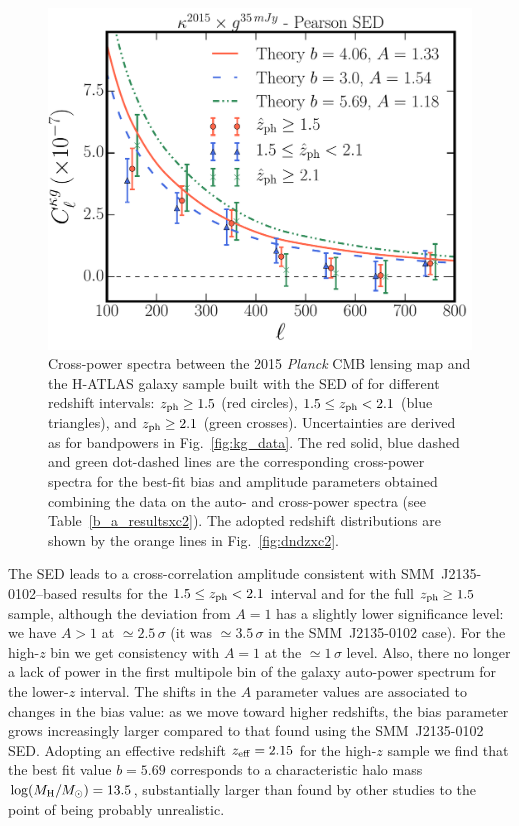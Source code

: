 \begin{figure} %
\centering %
\includegraphics[width=\textwidth]{Chapter4/Images/kg_ALL_2015_z15_21_10_Pearson_35mJy_3sigma}
\caption{Cross-power spectra between the 2015 \emph{Planck} CMB lensing map and the H-ATLAS galaxy sample built with the SED of \cite{Pearson2013} for different redshift intervals: $z_{\rm{ph}} \ge 1.5$ (red circles), $1.5 \le z_{\rm{ph}} < 2.1$ (blue triangles), and $z_{\rm{ph}}\ge 2.1$ (green crosses). Uncertainties are derived as for bandpowers in Fig.~\eqref{fig:kg_data}. The red solid, blue dashed and green dot-dashed lines are the corresponding cross-power spectra for the best-fit bias and amplitude parameters obtained combining the data on the auto- and cross-power spectra (see Table~\eqref{b_a_resultsxc2}). The adopted redshift distributions are shown by the orange lines in Fig.~\eqref{fig:dndzxc2}.
\label{fig:kg_data_tomo_Pearson}}
\end{figure}

The \citet{Pearson2013} SED leads to a cross-correlation amplitude consistent with SMM~J2135-0102--based results for the $1.5 \le z_{\rm{ph}} < 2.1$ interval and for the full $z_{\rm{ph}}\ge 1.5$ sample, although the deviation from $A=1$ has a slightly lower significance level: we have $A>1$ at $\simeq 2.5\,\sigma$ (it was $\simeq 3.5\,\sigma$ in the SMM~J2135-0102 case). For the high-$z$ bin we get consistency with $A=1$ at the $\simeq 1\,\sigma$ level. Also, there no longer a lack of power in the first multipole bin of the galaxy auto-power spectrum for the lower-$z$ interval. The shifts in the $A$ parameter values are associated to changes in the bias value: as we move toward higher redshifts, the bias parameter grows increasingly larger compared to that found using the  SMM~J2135-0102 SED. Adopting an effective redshift $z_{\rm{eff}}=2.15$ for the high-$z$ sample we find that the best fit value $b=5.69$ corresponds to a characteristic halo mass $\log(M_{\rm H}/M_\odot)=13.5$, substantially larger than found by other studies \citep{Xia2012,Hickox2012,Cai2013,Viero2013,Hildebrandt2013} to the point of being probably unrealistic. 

